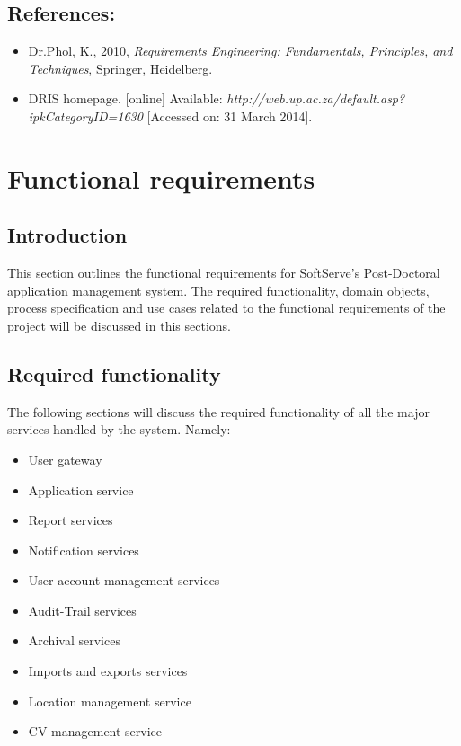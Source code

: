 \documentclass[12pt]{article}
\begin{document}
\vspace{0.2in}

\subsection{References:}
\vspace{0.1in}
\begin{itemize}
\item Dr.Phol, K., 2010, \textit{Requirements Engineering: Fundamentals, Principles, and Techniques}, Springer, Heidelberg.
\item DRIS homepage. [online] Available: \textit{http://web.up.ac.za/default.asp?ipkCategoryID=1630} [Accessed on: 31 March 2014].
\end{itemize}	

\vspace{0.5in}

\newpage
\section{Functional requirements}
\subsection{Introduction} %
\vspace{0.2in}
This section outlines the functional requirements for SoftServe's Post-Doctoral application management system.
The required functionality, domain objects, process specification and use cases related to the functional requirements of the project will be discussed in this sections.
\vspace{0.2in}

\subsection{Required functionality} %
\vspace{0.2in}
The following sections will discuss the required functionality of all the major services handled by the system. Namely:
\begin{itemize}
\item User gateway
\item Application service
\item Report services
\item Notification services
\item User account management services
\item Audit-Trail services
\item Archival services
\item Imports and exports services
\item Location management service
\item CV management service
\end{itemize}
\end{document}
